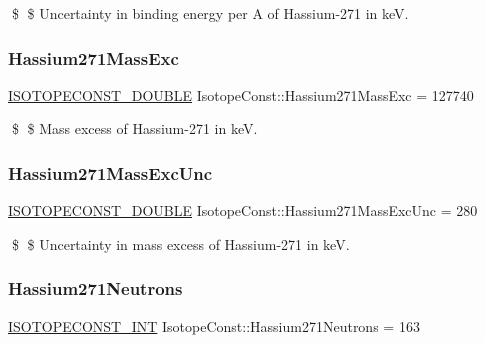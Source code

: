 \$ \$ Uncertainty in binding energy per A of Hassium-\/271 in keV. \mbox{\label{group___isotope_const-_hassium-_hs271_ga602d25e9923b112798c458f95afc0bd1}} 
\subsubsection{\texorpdfstring{Hassium271\+Mass\+Exc}{Hassium271MassExc}}
{\footnotesize\ttfamily \mbox{\hyperlink{group___isotope_const-_macros_ga8f45a7272ce02c0b4c65c44636ed719a}{I\+S\+O\+T\+O\+P\+E\+C\+O\+N\+S\+T\+\_\+\+D\+O\+U\+B\+LE}} Isotope\+Const\+::\+Hassium271\+Mass\+Exc = 127740}

\$ \$ Mass excess of Hassium-\/271 in keV. \mbox{\label{group___isotope_const-_hassium-_hs271_gacbcf4114c4854bda443607d35e5d70ea}} 
\subsubsection{\texorpdfstring{Hassium271\+Mass\+Exc\+Unc}{Hassium271MassExcUnc}}
{\footnotesize\ttfamily \mbox{\hyperlink{group___isotope_const-_macros_ga8f45a7272ce02c0b4c65c44636ed719a}{I\+S\+O\+T\+O\+P\+E\+C\+O\+N\+S\+T\+\_\+\+D\+O\+U\+B\+LE}} Isotope\+Const\+::\+Hassium271\+Mass\+Exc\+Unc = 280}

\$ \$ Uncertainty in mass excess of Hassium-\/271 in keV. \mbox{\label{group___isotope_const-_hassium-_hs271_gae52269408e7597d9e2d29f69f4dd4ec5}} 
\subsubsection{\texorpdfstring{Hassium271\+Neutrons}{Hassium271Neutrons}}
{\footnotesize\ttfamily \mbox{\hyperlink{group___isotope_const-_macros_ga5f18360b3e99483a35c32d789e62621c}{I\+S\+O\+T\+O\+P\+E\+C\+O\+N\+S\+T\+\_\+\+I\+NT}} Isotope\+Const\+::\+Hassium271\+Neutrons = 163}


